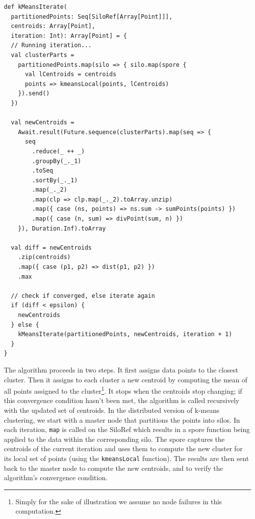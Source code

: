 \documentclass{jfp1}
\begin{document}

\begin{lstlisting}
def kMeansIterate(
  partitionedPoints: Seq[SiloRef[Array[Point]]],
  centroids: Array[Point],
  iteration: Int): Array[Point] = {
  // Running iteration...
  val clusterParts =
    partitionedPoints.map(silo => { silo.map(spore {
      val lCentroids = centroids
      points => kmeansLocal(points, lCentroids)
    }).send()
  })

  val newCentroids =
    Await.result(Future.sequence(clusterParts).map(seq => {
      seq
        .reduce(_ ++ _)
        .groupBy(_._1)
        .toSeq
        .sortBy(_._1)
        .map(_._2)
        .map(clp => clp.map(_._2).toArray.unzip)
        .map({ case (ns, points) => ns.sum -> sumPoints(points) })
        .map({ case (n, sum) => divPoint(sum, n) })
    }), Duration.Inf).toArray

  val diff = newCentroids
    .zip(centroids)
    .map({ case (p1, p2) => dist(p1, p2) })
    .max

  // check if converged, else iterate again
  if (diff < epsilon) {
    newCentroids
  } else {
    kMeansIterate(partitionedPoints, newCentroids, iteration + 1)
  }
}
\end{lstlisting}
\noindent
The algorithm proceeds in two steps. It first assigns data points to
the closest cluster. Then it assigns to each cluster a new centroid by
computing the mean of all points assigned to the cluster\footnote{Simply for the sake of illustration we assume no node failures in this computation.}. It stops
when the centroids stop changing; if this convergence condition hasn't
been met, the algorithm is called recursively with the updated set of
centroids. In the distributed version of k-means clustering, we start
with a master node that partitions the points into silos. In each
iteration, \verb|map| is called on the SiloRef which results in a
spore function being applied to the data within the corresponding
silo. The spore captures the centroids of the current iteration and
uses them to compute the new cluster for its local set of points
(using the \verb|kmeansLocal| function). The results are then sent
back to the master node to compute the new centroids, and to verify
the algorithm's convergence condition.
\end{document}
